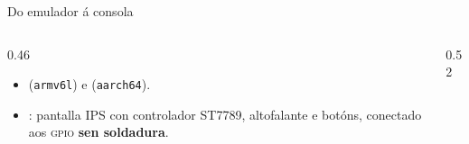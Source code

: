 \begin{frame}{Do emulador á consola}
  \begin{columns}[c]
    \begin{column}{0.46\textwidth}
      \small
      \begin{itemize}

        \item {} (\texttt{armv6l}) e
         (\texttt{aarch64}).

        \item {}: pantalla \textsc{IPS} con controlador
        ST7789, altofalante e botóns, conectado aos \textsc{gpio} \textbf{sen soldadura}.

      \end{itemize}
    \end{column}
    \begin{column}{0.52\textwidth}
    \end{column}
  \end{columns}
\end{frame}

